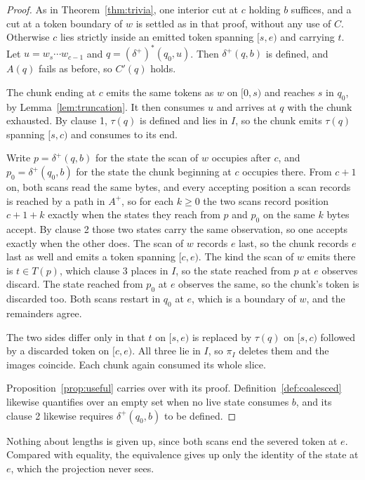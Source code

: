 \documentclass[11pt,a4paper]{article}
\theoremstyle{definition}
\theoremstyle{plain}
\begin{document}
\begin{proof}
As in Theorem~\ref{thm:trivia}, one interior cut at $c$ holding $b$ suffices, and a cut at a token boundary of $w$ is
settled as in that proof, without any use of $C$. Otherwise $c$ lies strictly inside an emitted token spanning $[s, e)$
and carrying $t$. Let $u = w_s \cdots w_{c-1}$ and $q = (\delta^+)^*(q_0, u)$. Then $\delta^+(q, b)$ is defined, and
$A(q)$ fails as before, so $C'(q)$ holds.

The chunk ending at $c$ emits the same tokens as $w$ on $[0, s)$ and reaches $s$ in $q_0$, by
Lemma~\ref{lem:truncation}. It then consumes $u$ and arrives at $q$ with the chunk exhausted. By clause 1, $\tau(q)$ is
defined and lies in $I$, so the chunk emits $\tau(q)$ spanning $[s, c)$ and consumes to its end.

Write $p = \delta^+(q, b)$ for the state the scan of $w$ occupies after $c$, and $p_0 = \delta^+(q_0, b)$ for the state
the chunk beginning at $c$ occupies there. From $c + 1$ on, both scans read the same bytes, and every accepting position
a scan records is reached by a path in $A^+$, so for each $k \geq 0$ the two scans record position $c + 1 + k$ exactly
when the states they reach from $p$ and $p_0$ on the same $k$ bytes accept. By clause 2 those two states carry the same
observation, so one accepts exactly when the other does. The scan of $w$ records $e$ last, so the chunk records $e$ last
as well and emits a token spanning $[c, e)$. The kind the scan of $w$ emits there is $t \in T(p)$, which clause 3 places
in $I$, so the state reached from $p$ at $e$ observes discard. The state reached from $p_0$ at $e$ observes the same, so
the chunk's token is discarded too. Both scans restart in $q_0$ at $e$, which is a boundary of $w$, and the remainders
agree.

The two sides differ only in that $t$ on $[s, e)$ is replaced by $\tau(q)$ on $[s, c)$ followed by a discarded token on
$[c, e)$. All three lie in $I$, so $\pi_I$ deletes them and the images coincide. Each chunk again consumed its whole
slice.

Proposition~\ref{prop:useful} carries over with its proof. Definition~\ref{def:coalesced} likewise quantifies over an
empty set when no live state consumes $b$, and its clause 2 likewise requires $\delta^+(q_0, b)$ to be defined.
\end{proof}

Nothing about lengths is given up, since both scans end the severed token at $e$. Compared with equality, the
equivalence gives up only the identity of the state at $e$, which the projection never sees.
\end{document}
